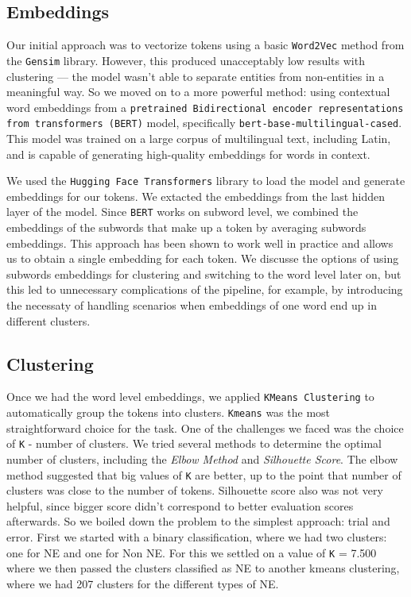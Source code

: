 \documentclass[11pt]{article}
\begin{document}
\subsection{Embeddings}

Our initial approach was to vectorize tokens using a basic \texttt{Word2Vec} method from the \texttt{Gensim} library. However, this produced 
unacceptably low results with clustering — the model wasn’t able to separate entities from non-entities in a meaningful way. So we moved on to
a more powerful method: using contextual word embeddings from a \texttt{pretrained Bidirectional encoder representations from transformers (BERT)} model,
specifically \texttt{bert-base-multilingual-cased}. This model was trained on a large corpus of multilingual text, including Latin, and is
capable of generating high-quality embeddings for words in context.

We used the \texttt{Hugging Face Transformers} library to load the model and generate embeddings for our tokens. We extacted the embeddings
from the last hidden layer of the model. Since \texttt{BERT} works on subword level, we combined the embeddings of the subwords that make up
a token by averaging subwords embeddings. This approach has been shown to work well in practice and allows us to obtain a single embedding for
each token. We discusse the options of using subwords embeddings for clustering and switching to the word level later on, but this led to
unnecessary complications of the pipeline, for example, by introducing the necessaty of handling scenarios when embeddings of one word end up
in different clusters.

\subsection{Clustering}

Once we had the word level embeddings, we applied \texttt{KMeans Clustering} to automatically group the tokens into clusters. \texttt{Kmeans}
was the most straightforward choice for the task. One of the challenges we faced was the choice of \texttt{K} - number of clusters. We tried
several methods to determine the optimal number of clusters, including the \textit{Elbow Method} and \textit{Silhouette Score}. 
The elbow method suggested that big values of \texttt{K} are better, up to the point that number of clusters was close to the number of tokens.
Silhouette score also was not very helpful, since bigger score didn't correspond to better evaluation scores afterwards. So we boiled down the
problem to the simplest approach: trial and error.
First we started with a binary classification, where we had two clusters: one for NE and one for Non NE. For this we settled on a value of \texttt{K} = 7.500 
where we then passed the clusters classified as NE to another kmeans clustering, where we had 207 clusters for the different types of NE.
\end{document}

